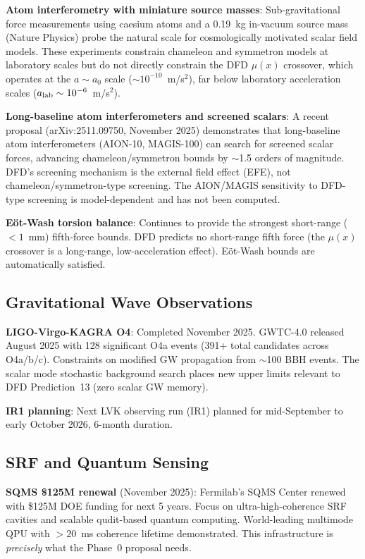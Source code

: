 \documentclass[11pt]{article}
\begin{document}
\textbf{Atom interferometry with miniature source masses}: Sub-gravitational
force measurements using caesium atoms and a 0.19~kg in-vacuum source
mass (Nature Physics) probe the natural scale for cosmologically motivated
scalar field models. These experiments constrain chameleon and symmetron
models at laboratory scales but do not directly constrain the DFD
$\mu(x)$ crossover, which operates at the $a \sim a_0$ scale
($\sim 10^{-10}$~m/s$^2$), far below laboratory acceleration scales
($a_{\rm lab} \sim 10^{-6}$~m/s$^2$).

\textbf{Long-baseline atom interferometers and screened scalars}:
A recent proposal (arXiv:2511.09750, November 2025) demonstrates that
long-baseline atom interferometers (AION-10, MAGIS-100) can search for
screened scalar forces, advancing chameleon/symmetron bounds by
$\sim$1.5 orders of magnitude. DFD's screening mechanism is the
external field effect (EFE), not chameleon/symmetron-type screening.
The AION/MAGIS sensitivity to DFD-type screening is model-dependent
and has not been computed.

\textbf{E\"ot-Wash torsion balance}: Continues to provide the strongest
short-range ($< 1$~mm) fifth-force bounds. DFD predicts no short-range
fifth force (the $\mu(x)$ crossover is a long-range, low-acceleration
effect). E\"ot-Wash bounds are automatically satisfied.

\subsection{Gravitational Wave Observations}

\textbf{LIGO-Virgo-KAGRA O4}: Completed November 2025. GWTC-4.0
released August 2025 with 128 significant O4a events (391+ total
candidates across O4a/b/c). Constraints on modified GW propagation
from $\sim$100 BBH events. The scalar mode stochastic background
search places new upper limits relevant to DFD Prediction~13 (zero
scalar GW memory).

\textbf{IR1 planning}: Next LVK observing run (IR1) planned for
mid-September to early October 2026, 6-month duration.

\subsection{SRF and Quantum Sensing}

\textbf{SQMS \$125M renewal} (November 2025): Fermilab's SQMS
Center renewed with \$125M DOE funding for next 5 years. Focus
on ultra-high-coherence SRF cavities and scalable qudit-based
quantum computing. World-leading multimode QPU with $>20$~ms
coherence lifetime demonstrated. This infrastructure is
\emph{precisely} what the Phase~0 proposal needs.
\end{document}
